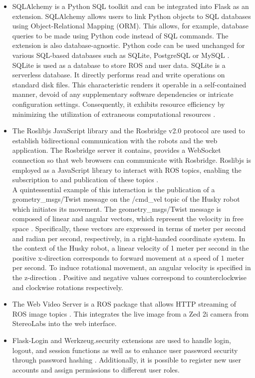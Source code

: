 \documentclass[conference]{IEEEtran}
\begin{document}
\begin{itemize}
\item SQLAlchemy is a Python SQL toolkit and can be integrated into Flask as an extension. SQLAlchemy allows users to link Python objects to SQL databases using Object-Relational Mapping (ORM). This allows, for example, database queries to be made using Python code instead of SQL commands. The extension is also database-agnostic. 
Python code can be used unchanged for various SQL-based databases such as SQLite, PostgreSQL or MySQL \cite{sqlalchemy}. 
SQLite is used as a database to store ROS and user data. SQLite is a serverless database. It directly performs read and write operations on standard disk files. This characteristic renders it operable in a self-contained manner, devoid of any supplementary software dependencies or intricate configuration settings. Consequently, it exhibits resource efficiency by minimizing the utilization of extraneous computational resources \cite{sqlite}.
\item The Roslibjs JavaScript library and the Rosbridge v2.0 protocol are used to establish bidirectional communication with the robots and the web application. The Rosbridge server it contains, provides a WebSocket connection so that web browsers can communicate with Rosbridge.
Roslibjs is employed as a JavaScript library to interact with ROS topics, enabling the subscription to and publication of these topics \cite{rosbridgeOkState} \cite{rosbridgeSuite}.\\ A quintessential example of this interaction is the publication of a geometry\_msgs/Twist message on the /cmd\_vel topic of the Husky robot which initiates its movement.
The geometry\_msgs/Twist message is composed of linear and angular vectors, which represent the velocity in free space \cite{twistmsg}. Specifically, these vectors are expressed in terms of meter per second and radian per second, respectively, in a right-handed coordinate system.
In the context of the Husky robot, a linear velocity of 1 meter per second in the positive x-direction corresponds to forward movement at a speed of 1 meter per second. To induce rotational movement, an angular velocity is specified in the z-direction \cite{huskydriving}. Positive and negative values correspond to counterclockwise and clockwise rotations respectively.
\item The Web Video Server is a ROS package that allows HTTP streaming of ROS image topics \cite{webvideoserver}. This integrates the live image from a Zed 2i camera from StereoLabs into the web interface.
\item Flask-Login and Werkzeug.security extensions are used to handle login, logout, and session functions as well as to enhance user password security through password hashing \cite{flasklogin} \cite{werkzeug}. Additionally, it is possible to register new user accounts and assign permissions to different user roles. 
\end{itemize}
\end{document}
